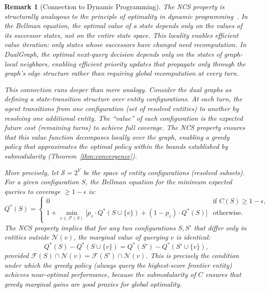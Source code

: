 \documentclass[11pt,a4paper]{article}
\newtheorem{remark}{Remark}
\begin{document}
\begin{remark}[Connection to Dynamic Programming]
\label{rem:dp}
The NCS property is structurally analogous to the \emph{principle of
optimality} in dynamic programming~\cite{bellman1957dynamic}. In the Bellman
equation, the optimal value of a state depends only on the values of its
successor states, not on the entire state space. This locality enables
efficient value iteration: only states whose successors have changed need
recomputation. In DualGraph, the optimal next-query decision depends only
on the states of graph-local neighbors, enabling efficient priority updates
that propagate only through the graph's edge structure rather than requiring
global recomputation at every turn.

This connection runs deeper than mere analogy. Consider the dual graphs
as defining a state-transition structure over entity configurations. At each
turn, the agent transitions from one configuration (set of resolved entities)
to another by resolving one additional entity. The ``value'' of each
configuration is the expected future cost (remaining turns) to achieve full
coverage. The NCS property ensures that this value function decomposes
locally over the graph, enabling a greedy policy that approximates the
optimal policy within the bounds established by submodularity
(Theorem~\ref{thm:convergence}).

More precisely, let $\mathcal{S} = 2^V$ be the space of entity
configurations (resolved subsets). For a given configuration $S$, the
Bellman equation for the minimum expected queries to coverage
$\geq 1 - \epsilon$ is:
\[
  Q^*(S) = \begin{cases}
    0 & \text{if } C(S) \geq 1 - \epsilon, \\
    1 + \min_{v \in \mathcal{F}(S)} \bigl[p_v \cdot Q^*(S \cup \{v\})
      + (1 - p_v) \cdot Q^*(S)\bigr] & \text{otherwise.}
  \end{cases}
\]
The NCS property implies that for any two configurations $S, S'$ that differ
only in entities \emph{outside} $\mathcal{N}(v)$, the marginal value of
querying $v$ is identical:
\[
  Q^*(S) - Q^*(S \cup \{v\}) = Q^*(S') - Q^*(S' \cup \{v\}),
\]
provided $\mathcal{F}(S) \cap \mathcal{N}(v) = \mathcal{F}(S') \cap
\mathcal{N}(v)$. This is precisely the condition under which the greedy
policy (always query the highest-score frontier entity) achieves near-optimal
performance, because the submodularity of $C$ ensures that greedy marginal
gains are good proxies for global optimality.
\end{remark}
\end{document}
